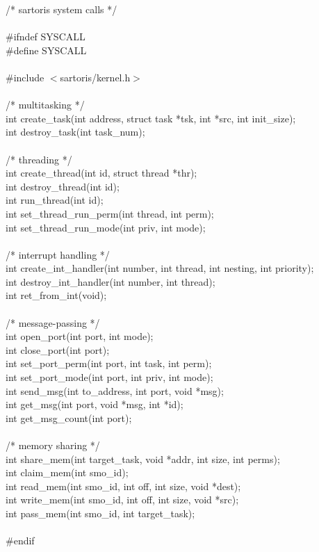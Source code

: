 \documentclass[12pt, letterpaper, oneside, english]{article}
\begin{document}
\begin{sf}
\noindent /* sartoris system calls */ \\
\\
\#ifndef SYSCALL \\ 
\#define SYSCALL \\
\\
\#include $<$sartoris/kernel.h$>$ \\
\\
/* multitasking */ \\
int create\_task(int address, struct task *tsk, int *src, int init\_size); \\
int destroy\_task(int task\_num); \\
\\
/* threading */ \\
int create\_thread(int id, struct thread *thr); \\
int destroy\_thread(int id); \\
int run\_thread(int id); \\
int set\_thread\_run\_perm(int thread, int perm); \\
int set\_thread\_run\_mode(int priv, int mode); \\
\\
/* interrupt handling */ \\
int create\_int\_handler(int number, int thread, int nesting, int priority); \\
int destroy\_int\_handler(int number, int thread); \\
int ret\_from\_int(void); \\
\\
/* message-passing */ \\
int open\_port(int port, int mode);\\
int close\_port(int port);\\
int set\_port\_perm(int port, int task, int perm);\\
int set\_port\_mode(int port, int priv, int mode);\\
int send\_msg(int to\_address, int port, void *msg); \\
int get\_msg(int port, void *msg, int *id); \\
int get\_msg\_count(int port); \\
\\
/* memory sharing */ \\
int share\_mem(int target\_task, void *addr, int size, int perms); \\
int claim\_mem(int smo\_id); \\
int read\_mem(int smo\_id, int off, int size, void *dest); \\
int write\_mem(int smo\_id, int off, int size, void *src); \\ 
int pass\_mem(int smo\_id, int target\_task); \\
\\
\#endif \\ \\
\end{sf}
\end{document}
